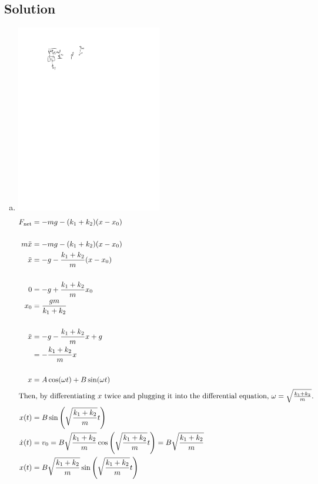 \documentclass[solutions]{esg8012pset}
\begin{document}
\subsection*{Solution}
  \begin{enumerate}[a)]
    \item \includegraphics[width=0.5\textwidth]{2009-10-02_Diagram_5_1}\begin{align*}
     F_{\text{net}} & = -mg -(k_1 + k_2)(x - x_0) \\
     \\
     m\ddot x & = -mg -(k_1 + k_2)(x - x_0) \\
     \ddot x & = -g -\frac{k_1 + k_2}{m}(x - x_0) \\
     \\
     0 & = -g + \frac{k_1 + k_2}{m}x_0 \\
     x_0 & = \frac{gm}{k_1 + k_2} \\
     \\
     \ddot x & = -g - \frac{k_1 + k_2}{m}x + g \\
      & = -\frac{k_1 + k_2}{m}x\\
      \\
      x & = A\cos(\omega t) + B\sin(\omega t) \\
      \intertext{Then, by differentiating $x$ twice and plugging it into the differential equation, $\omega = \sqrt{\frac{k_1 + k_2}{m}}$.}
      x(t) & = B\sin\left(\sqrt{\frac{k_1 + k_2}{m}}t\right) \\
      \dot x(t) & = v_0 = B\sqrt{\frac{k_1 + k_2}{m}}\cos\left(\sqrt{\frac{k_1 + k_2}{m}}t\right) = B\sqrt{\frac{k_1 + k_2}{m}} \\
      x(t) & = B\sqrt{\frac{k_1 + k_2}{m}}\sin\left(\sqrt{\frac{k_1 + k_2}{m}}t\right) \\

\end{align*}
\end{enumerate}
\end{document}
